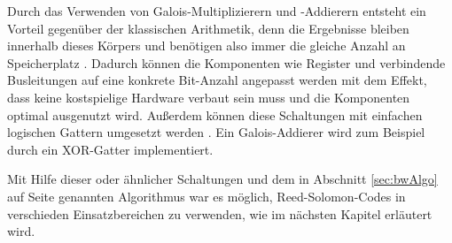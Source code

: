Durch das Verwenden von Galois-Multiplizierern und -Addierern entsteht ein Vorteil gegenüber der klassischen Arithmetik, denn die Ergebnisse bleiben innerhalb dieses Körpers und benötigen also immer die gleiche Anzahl an Speicherplatz \cite{weitzKonkreteMathematikNicht2021}.
Dadurch können die Komponenten wie Register und verbindende Busleitungen auf eine konkrete Bit-Anzahl angepasst werden mit dem Effekt, dass keine kostspielige Hardware verbaut sein muss und die Komponenten optimal ausgenutzt wird.
Außerdem können diese Schaltungen mit einfachen logischen Gattern umgesetzt werden \cite{biernatHardwareImplementationReedSolomon2010, southwellIntroductionErrorDetection}.
Ein Galois-Addierer wird zum Beispiel durch ein XOR-Gatter implementiert.

Mit Hilfe dieser oder ähnlicher Schaltungen und dem in Abschnitt \ref{sec:bwAlgo} auf Seite \pageref{sec:bwAlgo} genannten Algorithmus war es möglich, Reed-Solomon-Codes in verschieden Einsatzbereichen zu verwenden, wie im nächsten Kapitel erläutert wird.
